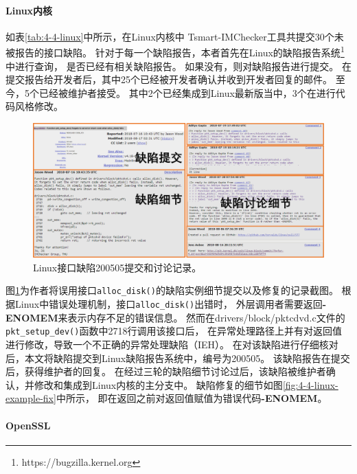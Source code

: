 

\paragraph{Linux内核}
如表\ref{tab:4-4-linux}中所示，在Linux内核中
Tsmart-IMChecker工具共提交30个未被报告的接口缺陷。
针对于每一个缺陷报告，本者首先在Linux的缺陷报告系统\footnote{https://bugzilla.kernel.org}中进行查询，
是否已经有相关缺陷报告。
如果没有，则对缺陷报告进行提交。
在提交报告给开发者后，其中25个已经被开发者确认并收到开发者回复的邮件。
至今，5个已经被维护者接受。
其中2个已经集成到Linux最新版当中，3个在进行代码风格修改。

\begin{figure}[b]
	\centering
	\includegraphics[width=\linewidth]{figures/cp4-linux-example.png}
	\caption{
		Linux接口缺陷200505提交和讨论记录。
	}
	\label{fig:4-4-linux-example}
\end{figure}




图\ref{fig:4-4-linux-example}为作者将误用接口\texttt{alloc\_disk()}的缺陷实例细节提交以及修复的记录截图。
根据Linux中错误处理机制，接口\texttt{alloc\_disk()}出错时，
外层调用者需要返回\textbf{-ENOMEM}来表示内存不足的错误信息。
然而在drivers/block/pktcdvd.c文件的\texttt{pkt\_setup\_dev()}函数中2718行调用该接口后，
在异常处理路径上并有对返回值进行修改，导致一个不正确的异常处理缺陷（IEH）。
在对该缺陷进行仔细核对后，本文将缺陷提交到Linux缺陷报告系统中，编号为200505。
该缺陷报告在提交后，获得维护者的回复。
在经过三轮的缺陷细节讨论过后，该缺陷被维护者确认，并修改和集成到Linux内核的主分支中。
缺陷修复的细节如图\ref{fig:4-4-linux-example-fix}中所示，
即在返回之前对返回值赋值为错误代码\textbf{-ENOMEM}。


\paragraph{OpenSSL}


